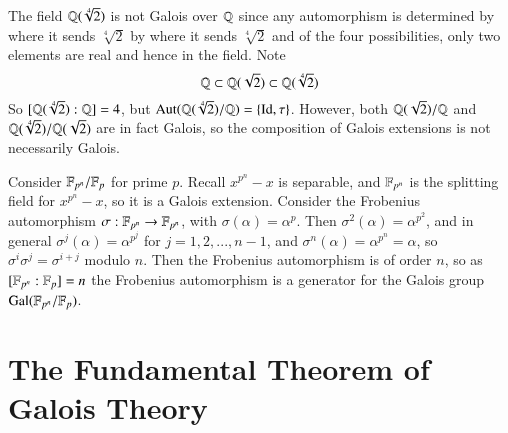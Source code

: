 \begin{eg}
\begin{center}
    \end{center}
\end{eg}


\begin{eg}
    The field $\mathbb Q(\sqrt[4]{2})$ is not Galois over $\mathbb Q$ since any automorphism is determined by where it sends $\sqrt[4]{2}$ by where it sends $\sqrt[4]{2}$ and of the four possibilities, only two elements are real and hence in the field. Note \begin{equation*}
        \mathbb Q \subset \mathbb Q(\sqrt{2}) \subset \mathbb Q(\sqrt[4]{2})
    \end{equation*}
    So $[\mathbb Q(\sqrt[4]{2}):\mathbb Q] = 4$, but $\operatorname{Aut}(\mathbb Q(\sqrt[4]{2})/\mathbb Q) = \{\operatorname{Id}, \tau\}$. However, both $\mathbb Q(\sqrt{2})/\mathbb Q$ and $\mathbb Q(\sqrt[4]{2})/\mathbb Q(\sqrt{2})$ are in fact Galois, so the composition of Galois extensions is not necessarily Galois.
\end{eg}

\begin{eg}
    Consider $\mathbb F_{p^n}/\mathbb F_p$ for prime $p$. Recall $x^{p^n}-x$ is separable, and $\mathbb F_{p^n}$ is the splitting field for $x^{p^n}-x$, so it is a Galois extension. Consider the Frobenius automorphism $\sigma:\mathbb F_{p^n}\rightarrow \mathbb F_{p^n}$, with $\sigma(\alpha) = \alpha^p$. Then $\sigma^2(\alpha) = \alpha^{p^2}$, and in general $\sigma^j(\alpha) = \alpha^{p^j}$ for $j = 1,2,...,n-1$, and $\sigma^n(\alpha) = \alpha^{p^n} = \alpha$, so $\sigma^i\sigma^j = \sigma^{i+j}$ modulo $n$. Then the Frobenius automorphism is of order $n$, so as $[\mathbb F_{p^n}:\mathbb F_p] = n$ the Frobenius automorphism is a generator for the Galois group $\text{Gal}(\mathbb F_{p^n}/\mathbb F_p)$.
\end{eg}







\section{\textsection The Fundamental Theorem of Galois Theory}


